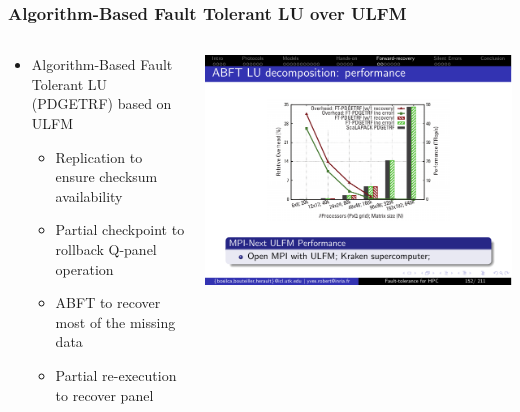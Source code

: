 \begin{frame}
  \frametitle{Algorithm-Based Fault Tolerant LU over ULFM}

  \begin{columns}
    \begin{column}{.3\textwidth}
      \begin{itemize}
      \item Algorithm-Based Fault Tolerant LU (PDGETRF) based on ULFM
        \begin{itemize}
        \item Replication to ensure checksum availability
        \item Partial checkpoint to rollback Q-panel operation
        \item ABFT to recover most of the missing data
        \item Partial re-execution to recover panel
        \end{itemize}
      \end{itemize}
    \end{column}
    \begin{column}{.7\textwidth}
        \begin{center}
          \includegraphics[width=.9\linewidth]{../figures/abftlu-perf.pdf}
        \end{center}
    \end{column}
  \end{columns}
\end{frame}
